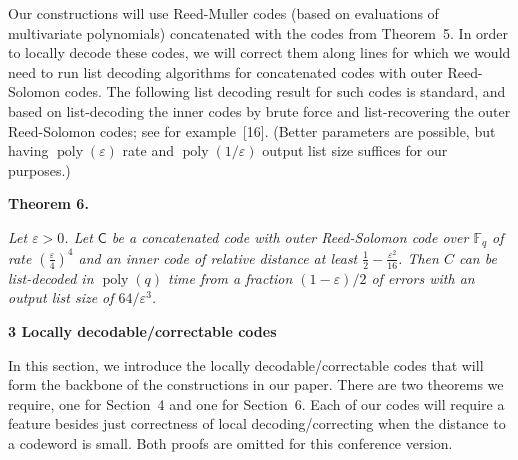 \documentclass[10pt,a4paper]{article}
\begin{document}



Our constructions will use Reed-Muller codes (based on evaluations of multivariate polynomials) concatenated with the codes from Theorem 5.
In order to locally decode these codes, we will correct them along lines for which we would need to run list decoding algorithms for concatenated codes with outer Reed-Solomon codes. The following list decoding result for such codes is standard, and based on list-decoding the inner codes by brute force and list-recovering the outer Reed-Solomon codes; see for example [16]. (Better parameters are possible, but having $\operatorname{poly}(\varepsilon)$ rate and $\operatorname{poly}(1/\varepsilon)$ output list size suffices for our purposes.)\par





\par\medskip\noindent\textbf{
\textbf{Theorem 6}\textbf{.}
}\par



\emph{Let $\varepsilon>0$. Let $\mathsf{C}$ be a concatenated code with outer Reed-Solomon code over ${\mathbb{F}}_{q}$ of rate $(\frac{\varepsilon}{4})^{4}$ and an inner code of relative distance at least $\tfrac{1}{2}-\tfrac{\varepsilon^{2}}{16}$. Then $C$ can be list-decoded in $\operatorname{poly}(q)$ time from a fraction $(1-\varepsilon)/2$ of errors with an output list size of $64/\varepsilon^{3}$.}\par








\par\medskip\noindent\textbf{
3 Locally decodable/correctable codes}\par




In this section, we introduce the locally decodable/correctable codes that will form the backbone of the constructions in our paper. There are two theorems we require, one for Section 4 and one for Section 6. Each of our codes will require a feature besides just correctness of local decoding/correcting when the distance to a codeword is small. Both proofs are omitted for this conference version.\par
\end{document}
